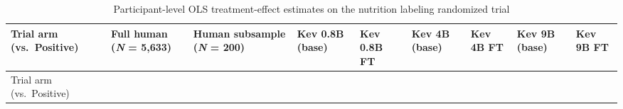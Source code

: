 \documentclass[
  letterpaper,
  DIV=11,
  numbers=noendperiod]{scrartcl}
\begin{document}
\nexttablesize{\scriptsize}
{\def\LTcaptype{apptbl}
\begin{longtable}[]{@{}
  >{\raggedright\arraybackslash}p{}
  >{\raggedleft\arraybackslash}p{}
  >{\raggedleft\arraybackslash}p{}
  >{\raggedleft\arraybackslash}p{}
  >{\raggedleft\arraybackslash}p{}
  >{\raggedleft\arraybackslash}p{}
  >{\raggedleft\arraybackslash}p{}
  >{\raggedleft\arraybackslash}p{}
  >{\raggedleft\arraybackslash}p{}@{}}
\caption{{\label{apptbl-grummon2025-coefs}}Participant-level OLS
treatment-effect estimates on the nutrition labeling randomized trial}\tabularnewline
\toprule\noalign{}
\begin{minipage}[b]{\linewidth}\raggedright
Trial arm (vs.~Positive)
\end{minipage} & \begin{minipage}[b]{\linewidth}\raggedleft
Full human (\emph{N} = 5,633)
\end{minipage} & \begin{minipage}[b]{\linewidth}\raggedleft
Human subsample (\emph{N} = 200)
\end{minipage} & \begin{minipage}[b]{\linewidth}\raggedleft
Kev 0.8B (base)
\end{minipage} & \begin{minipage}[b]{\linewidth}\raggedleft
Kev 0.8B FT
\end{minipage} & \begin{minipage}[b]{\linewidth}\raggedleft
Kev 4B (base)
\end{minipage} & \begin{minipage}[b]{\linewidth}\raggedleft
Kev 4B FT
\end{minipage} & \begin{minipage}[b]{\linewidth}\raggedleft
Kev 9B (base)
\end{minipage} & \begin{minipage}[b]{\linewidth}\raggedleft
Kev 9B FT
\end{minipage} \\
\midrule\noalign{}
\endfirsthead
\toprule\noalign{}
\begin{minipage}[b]{\linewidth}\raggedright
Trial arm (vs.~Positive)

\end{minipage}
\end{longtable}}
\end{document}

